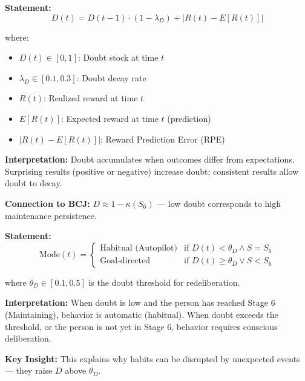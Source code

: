 \begin{tcolorbox}[colback=gray!5!white, colframe=gray!75!black,
    title=Axiom BCJ-AP1: Doubt Stock Definition]
\textbf{Statement:}
\begin{equation}
D(t) = D(t-1) \cdot (1 - \lambda_D) + |R(t) - E[R(t)]|
\end{equation}

where:
\begin{itemize}[nosep]
\item $D(t) \in [0, 1]$: Doubt stock at time $t$
\item $\lambda_D \in [0.1, 0.3]$: Doubt decay rate
\item $R(t)$: Realized reward at time $t$
\item $E[R(t)]$: Expected reward at time $t$ (prediction)
\item $|R(t) - E[R(t)]|$: Reward Prediction Error (RPE)
\end{itemize}

\textbf{Interpretation:} Doubt accumulates when outcomes differ from expectations. Surprising results (positive or negative) increase doubt; consistent results allow doubt to decay.

\textbf{Connection to BCJ:} $D \approx 1 - \kappa(S_6)$ --- low doubt corresponds to high maintenance persistence.
\end{tcolorbox}

\begin{tcolorbox}[colback=gray!5!white, colframe=gray!75!black,
    title=Axiom BCJ-AP2: Autopilot Switching Rule]
\textbf{Statement:}
\begin{equation}
\text{Mode}(t) = \begin{cases}
\text{Habitual (Autopilot)} & \text{if } D(t) < \theta_D \land S = S_6 \\
\text{Goal-directed} & \text{if } D(t) \geq \theta_D \lor S < S_6
\end{cases}
\end{equation}

where $\theta_D \in [0.1, 0.5]$ is the doubt threshold for redeliberation.

\textbf{Interpretation:} When doubt is low and the person has reached Stage 6 (Maintaining), behavior is automatic (habitual). When doubt exceeds the threshold, or the person is not yet in Stage 6, behavior requires conscious deliberation.

\textbf{Key Insight:} This explains why habits can be disrupted by unexpected events --- they raise $D$ above $\theta_D$.
\end{tcolorbox}

